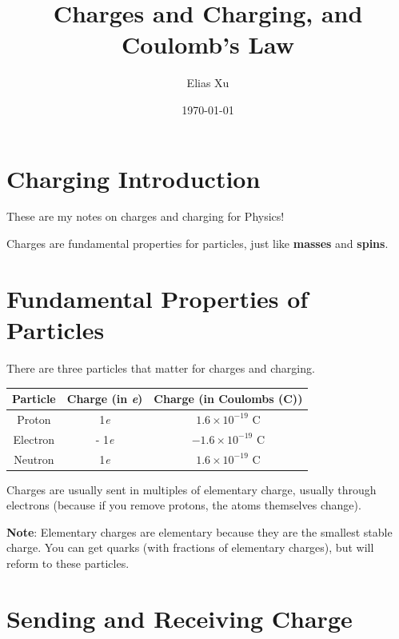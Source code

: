 \documentclass{article}
\begin{document}
\title{Charges and Charging, and Coulomb's Law}
\author{Elias Xu}
\date{\today}
\maketitle
\setlength{\parindent}{0pt}

\tableofcontents

\section{Charging Introduction}

These are my notes on charges and charging for Physics!

\medskip

Charges are fundamental properties for particles, just like \textbf{masses} and \textbf{spins}.

\section{Fundamental Properties of Particles}

There are three particles that matter for charges and charging.

\begin{table}[h]
    \centering
    \begin{tabular}{|c|c|c|}
        \hline
        Particle & Charge (in \textit{e}) & Charge (in Coulombs (C)) \\
        \hline
        Proton   & 1\textit{e}            & $1.6 \times 10^{-19}$ C  \\
        Electron & - 1\textit{e}          & $-1.6 \times 10^{-19}$ C \\
        Neutron  & 1\textit{e}            & $1.6\times 10^{-19}$ C   \\
        \hline
    \end{tabular}
\end{table}

Charges are usually sent in multiples of elementary charge, usually through electrons (because if you remove protons, the atoms themselves change).

\medskip
\textbf{Note}: Elementary charges are elementary because they are the smallest stable charge. You can get quarks (with fractions of elementary charges), but will reform to these particles.

\section{Sending and Receiving Charge}
\end{document}
